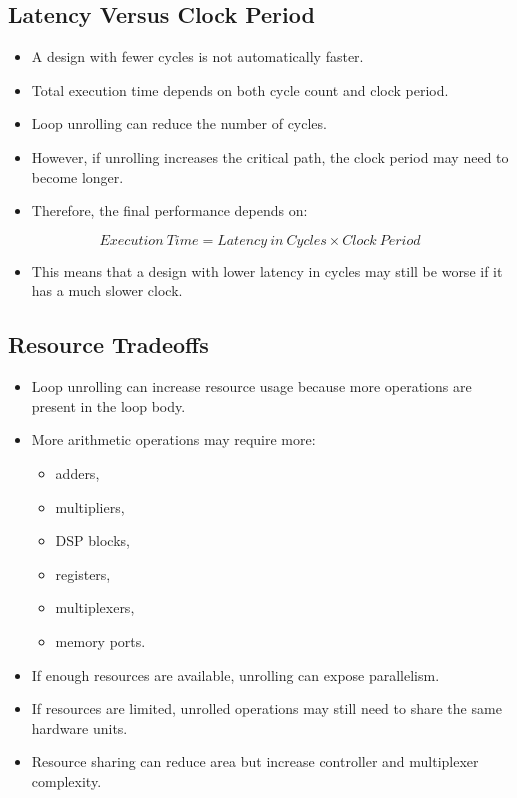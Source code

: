 \documentclass[conference]{IEEEtran}
\begin{document}
\subsection{Latency Versus Clock Period}

\begin{itemize}
    \item A design with fewer cycles is not automatically faster.
    \item Total execution time depends on both cycle count and clock period.
    \item Loop unrolling can reduce the number of cycles.
    \item However, if unrolling increases the critical path, the clock period may need to become longer.
    \item Therefore, the final performance depends on:
\end{itemize}

\begin{equation}
Execution\ Time = Latency\ in\ Cycles \times Clock\ Period
\end{equation}

\begin{itemize}
    \item This means that a design with lower latency in cycles may still be worse if it has a much slower clock.
\end{itemize}

\subsection{Resource Tradeoffs}

\begin{itemize}
    \item Loop unrolling can increase resource usage because more operations are present in the loop body.
    \item More arithmetic operations may require more:
    \begin{itemize}
        \item adders,
        \item multipliers,
        \item DSP blocks,
        \item registers,
        \item multiplexers,
        \item memory ports.
    \end{itemize}

    \item If enough resources are available, unrolling can expose parallelism.
    \item If resources are limited, unrolled operations may still need to share the same hardware units.
    \item Resource sharing can reduce area but increase controller and multiplexer complexity.
\end{itemize}
\end{document}
